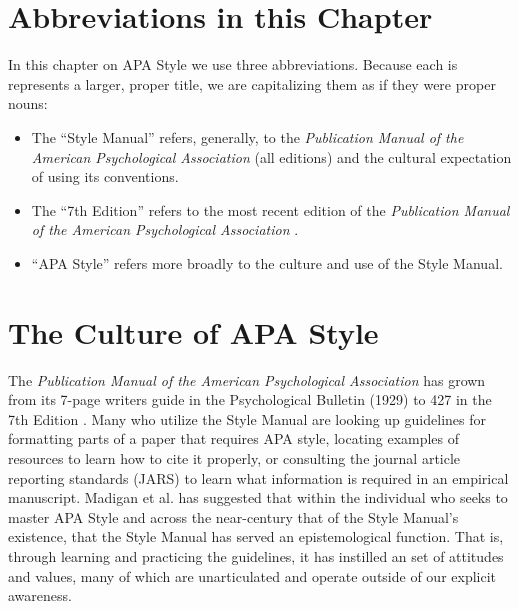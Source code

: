 \documentclass[
  11pt,
]{book}
\providecommand{\tightlist}{%
  \setlength{\itemsep}{0pt}\setlength{\parskip}{0pt}}
\begin{document}
\hypertarget{abbreviations-in-this-chapter}{%
\section{Abbreviations in this Chapter}\label{abbreviations-in-this-chapter}}

In this chapter on APA Style we use three abbreviations. Because each is represents a larger, proper title, we are capitalizing them as if they were proper nouns:

\begin{itemize}
\tightlist
\item
  The ``Style Manual'' refers, generally, to the \emph{Publication Manual of the American Psychological Association} (all editions) and the cultural expectation of using its conventions.
\item
  The ``7th Edition'' refers to the most recent edition of the \emph{Publication Manual of the American Psychological Association} \citeyearpar{american_psychological_association_ethical_20170}.
\item
  ``APA Style'' refers more broadly to the culture and use of the Style Manual.
\end{itemize}

\hypertarget{the-culture-of-apa-style}{%
\section{The Culture of APA Style}\label{the-culture-of-apa-style}}

The \emph{Publication Manual of the American Psychological Association} has grown from its 7-page writers guide in the Psychological Bulletin (1929) to 427 in the 7th Edition \citep{american_psychological_association_publication_2020}. Many who utilize the Style Manual are looking up guidelines for formatting parts of a paper that requires APA style, locating examples of resources to learn how to cite it properly, or consulting the journal article reporting standards (JARS) to learn what information is required in an empirical manuscript. Madigan et al. \citeyearpar{madigan_language_1995} has suggested that within the individual who seeks to master APA Style and across the near-century that of the Style Manual's existence, that the Style Manual has served an epistemological function. That is, through learning and practicing the guidelines, it has instilled an set of attitudes and values, many of which are unarticulated and operate outside of our explicit awareness.
\end{document}
